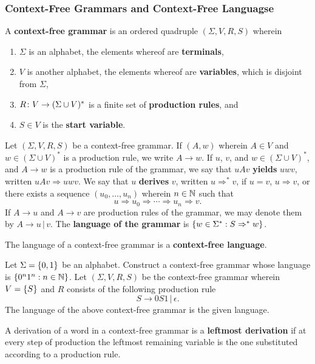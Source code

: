 \subsubsection{Context-Free Grammars and Context-Free Languagse}

\Bdf
    A {\bf context-free grammar} is an ordered quadruple \((\Sigma, V, R, S)\)
    wherein
    \begin{enumerate}
        \item \(\Sigma\) is an alphabet, the elements whereof are {\bf
        terminals},
        \item \(V\) is another alphabet, the elements whereof are {\bf
        variables}, which is disjoint from \(\Sigma\),
        \item \(R\colon V\to(\Sigma \cup V)^*\) is a finite set of {\bf
        production rules}, and
        \item \(S \in V\) is the {\bf start variable}.
    \end{enumerate}
\Edf

Let \((\Sigma, V, R, S)\) be a context-free grammar. If \((A, w)\) wherein \(A
\in V\) and \(w \in (\Sigma \cup V)^*\) is a production rule, we write \(A \to
w\). If \(u\), \(v\), and \(w \in (\Sigma \cup V)^*\), and \(A \to w\) is a
production rule of the grammar, we say that \(u A v\) {\bf yields} \(u w v\),
written \(u A v \Rightarrow u w v\). We say that \(u\) {\bf derives} \(v\),
written \(u \Rightarrow^* v\), if \(u = v\), \(u \Rightarrow v\), or there
exists a sequence \((u_0, \ldots, u_n)\) wherein \(n \in \mathbb{N}\) such that
\[
    u \Rightarrow u_0 \Rightarrow \cdots \Rightarrow u_n \Rightarrow v.
\]
If \(A \to u\) and \(A \to v\) are production rules of the grammar, we may
denote them by \(A \to u \, | \, v\). The {\bf language of the grammar} is
\(\{w \in \Sigma^* : S \Rightarrow^* w\}\).

The language of a context-free grammar is a {\bf context-free language}.

\Bxr
    Let \(\Sigma = \{0, 1\}\) be an alphabet. Construct a context-free grammar
    whose language is \(\{0^n 1^n : n \in \mathbb{N}\}\).
\Exr
\Bsl
    Let \((\Sigma, V, R, S)\) be the context-free grammar wherein \(V =
    \{S\}\) and \(R\) consists of the following production rule
    \[
        S \to 0 S 1 \, | \, \epsilon.
    \]
    The language of the above context-free grammar is the given language.
\Esl

A derivation of a word in a context-free grammar is a {\bf leftmost derivation}
if at every step of production the leftmost remaining variable is the one
substituted according to a production rule.

